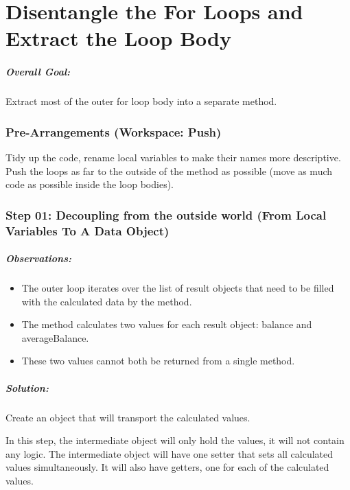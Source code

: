 \documentclass[a4paper,fleqn,titlepage,11pt]{article}
\begin{document}
\part{Disentangle the For Loops and Extract the Loop Body}

\subsubsection*{Overall Goal:}

Extract most of the outer for loop body into a separate method.

\section*{Pre-Arrangements (Workspace: Push)}

Tidy up the code, rename local variables to make their names more descriptive.
Push the loops as far to the outside of the method as possible (move as much code as possible inside the loop bodies).

\section*{Step 01: Decoupling from the outside world (From Local Variables To A Data Object)}

\subsubsection*{Observations:}
\begin{itemize}
\item The outer loop iterates over the list of result objects that need to be filled with the calculated data by the method.
\item The method calculates two values for each result object: balance and averageBalance. 
\item These two values cannot both be returned from a single method.
\end{itemize}

\subsubsection*{Solution:}

Create an object that will transport the calculated values. 

In this step, the intermediate object will only hold the values, it will not contain any logic. The intermediate object will have one setter that sets all calculated values simultaneously. It will also have getters, one for each of the calculated values.
\end{document}

